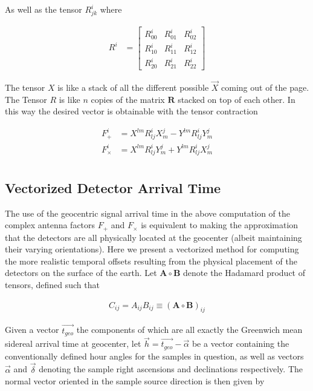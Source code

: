 As well as the tensor $R^{i}_{jk}$ where

\begin{align}
R^{i} &= 
\begin{bmatrix}
R^{i}_{00} & R^{i}_{01} & R^{i}_{02} \\ 
R^{i}_{10} & R^{i}_{11} & R^{i}_{12} \\ 
R^{i}_{20} & R^{i}_{21} & R^{i}_{22}  
\end{bmatrix}
\end{align}

The tensor $X$ is like a stack of all the different possible $\vec{X}$ coming out of the page. The Tensor $R$ is like $n$ copies of the matrix $\mathbf{R}$ stacked on top of each other. In this way the desired vector is obtainable with the tensor contraction

\begin{align}
F^{i}_{+} &= X^{lm}R^{i}_{lj}X^{j}_{m} - Y^{lm}R^{i}_{lj}Y^{j}_{m} \\ 
F^{i}_{\times} &= X^{lm}R^{i}_{lj}Y^{j}_{m} + Y^{lm}R^{i}_{lj}X^{j}_{m} \\ 
\end{align}


\subsection{Vectorized Detector Arrival Time}

The use of the geocentric signal arrival time in the above computation of the complex antenna factors $F_+$ and $F_\times$ is equivalent to making the approximation that the detectors are all physically located at the geocenter (albeit maintaining their varying orientations). Here we present a vectorized method for computing the more realistic temporal offsets resulting from the physical placement of the detectors on the surface of the earth. Let $\mathbf{A} \circ \mathbf{B}$ denote the Hadamard product of tensors, defined such that 

\begin{align}
C_{ij} = A_{ij}B_{ij} \equiv (\mathbf{A} \circ \mathbf{B})_{ij}
\end{align} 

Given a vector $\vec{t_{geo}}$ the components of which are all exactly the Greenwich mean sidereal arrival time at geocenter, let $\vec{h} = \vec{t_{geo}} - \vec{\alpha}$ be a vector containing the conventionally defined hour angles for the samples in question, as well as vectors $\vec{\alpha}$ and $\vec{\delta}$ denoting the sample right ascensions and declinations respectively. The normal vector oriented in the sample source direction is then given by   

